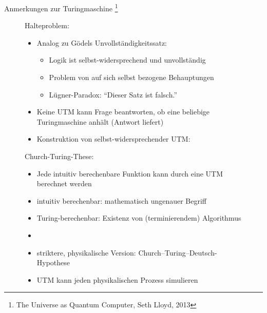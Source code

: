 \documentclass[aspectratio=1610, 9pt]{beamer}
\begin{document}
\begin{frame}{Anmerkungen zur Turingmaschine \footnote[8]{The Universe as Quantum Computer, Seth Lloyd, 2013}}
  \begin{figure}
    \begin{minipage}{0.55\textwidth}
      Halteproblem:
      \begin{itemize}
        \item Analog zu Gödels Unvollständigkeitssatz:
        \begin{itemize}
          \item Logik ist selbst-widersprechend und unvollständig
          \item Problem von auf sich selbst bezogene Behauptungen
          \item Lügner-Paradox: \enquote{Dieser Satz ist falsch.}
        \end{itemize}
        \item Keine UTM kann Frage beantworten, ob eine beliebige Turingmaschine anhält (Antwort liefert)
        \item Konstruktion von selbst-widersprechender UTM:
      \end{itemize}
      \begin{algorithm}[H]
      \end{algorithm}
    \end{minipage}
    \hfill
    \begin{minipage}{0.44\textwidth}
      Church-Turing-These:
      \begin{itemize}
        \item Jede intuitiv berechenbare Funktion kann durch eine UTM berechnet werden
        \item intuitiv berechenbar: mathematisch ungenauer Begriff
        \item Turing-berechenbar: Existenz von (terminierendem) Algorithmus
        \item[]
        \item striktere, physikalische Version: Church–Turing–Deutsch-Hypothese
        \item UTM kann jeden physikalischen Prozess simulieren
      \end{itemize}
    \end{minipage}
  \end{figure}
\end{frame}
\end{document}
